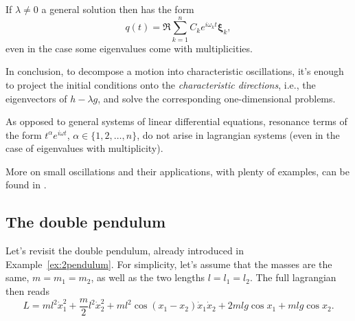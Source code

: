 \documentclass[english,fontsize=11pt,paper=a5,oneside]{scrbook}
\theoremstyle{definition}
\newenvironment{remark}
  {\pushQED{\qed}\renewcommand{\qedsymbol}{$\lozenge$}\remarkx}
  {\popQED\endremarkx}
\begin{document}
If $\lambda\neq 0$ a general solution then has the form
\begin{equation}
  q(t) = \Re \sum_{k=1}^n C_k e^{i \omega_k t}\bm{\xi}_k,
\end{equation}
even in the case some eigenvalues come with multiplicities.

In conclusion, to decompose a motion into characteristic oscillations, it's enough to project the initial conditions onto the \emph{characteristic directions}, i.e., the eigenvectors of $h - \lambda g$, and solve the corresponding one-dimensional problems.

\begin{remark}
  As opposed to general systems of linear differential equations, resonance terms of the form $t^\alpha e^{i \omega t}$, $\alpha\in\big\{1,2,\ldots,n\big\}$, do not arise in lagrangian systems (even in the case of eigenvalues with multiplicity).
\end{remark}

More on small oscillations and their applications, with plenty of examples, can be found in \cite[Chapters 23--25]{book:arnold}.

\subsection{The double pendulum}
Let's revisit the double pendulum, already introduced in Example~\ref{ex:2pendulum}.
For simplicity, let's assume that the masses are the same, $m = m_1 = m_2$, as well as the two lengths $l = l_1 = l_2$.
The full lagrangian then reads
\begin{equation}
  L = m l^2 \dot x_1^2
  + \frac m2 l^2 \dot x_2^2
  + m l^2 \cos(x_1 -x_2)\dot x_1 \dot x_2
  + 2ml g \cos x_1
  + mlg\cos x_2.
\end{equation}
\end{document}
